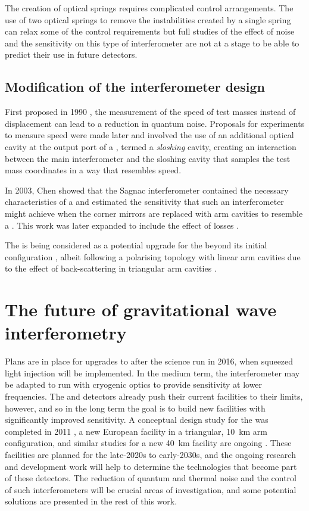 The creation of optical springs requires complicated control arrangements. The use of two optical springs to remove the instabilities created by a single spring can relax some of the control requirements \cite{Rehbein2008} but full studies of the effect of noise and the sensitivity on this type of interferometer are not at a stage to be able to predict their use in future detectors.

\subsection{Modification of the interferometer design}
First proposed in 1990 \cite{Braginsky1990}, the measurement of the speed of test masses instead of displacement can lead to a reduction in quantum noise. Proposals for experiments to measure speed were made later and involved the use of an additional optical cavity at the output port of a \MI{} \cite{Braginsky2000, Purdue2002}, termed a \emph{sloshing} cavity, creating an interaction between the main interferometer and the sloshing cavity that samples the test mass coordinates in a way that resembles speed.

In 2003, Chen showed that the Sagnac interferometer contained the necessary characteristics of a \SM{} \cite{Chen2003} and estimated the sensitivity that such an interferometer might achieve when the corner mirrors are replaced with arm cavities to resemble a \FPMI{}. This work was later expanded to include the effect of losses \cite{Danilishin2004, Danilishin2015}.

The \SSM{} is being considered as a potential upgrade for the \ET{} beyond its initial configuration \cite{Wang2013, Huttner2016}, albeit following a polarising topology with linear arm cavities \cite{Danilishin2004} due to the effect of back-scattering in triangular arm cavities \cite{Pascucci2016}.

\section{The future of gravitational wave interferometry}
Plans are in place for upgrades to \ALIGO{} after the science run in 2016, when squeezed light injection will be implemented. In the medium term, the interferometer may be adapted to run with cryogenic optics to provide sensitivity at lower frequencies. The \ALIGO{} and \AVIRGO{} detectors already push their current facilities to their limits, however, and so in the long term the goal is to build new facilities with significantly improved sensitivity. A conceptual design study for the \ET{} was completed in 2011 \cite{ET2011}, a new European facility in a triangular, \SI{10}{\kilo\meter} arm configuration, and similar studies for a new \SI{40}{\kilo\meter} \LIGO{} facility are ongoing \cite{Dwyer2015, aligocosmic2016}. These facilities are planned for the late-2020s to early-2030s, and the ongoing research and development work will help to determine the technologies that become part of these detectors. The reduction of quantum and thermal noise and the control of such interferometers will be crucial areas of investigation, and some potential solutions are presented in the rest of this work.
